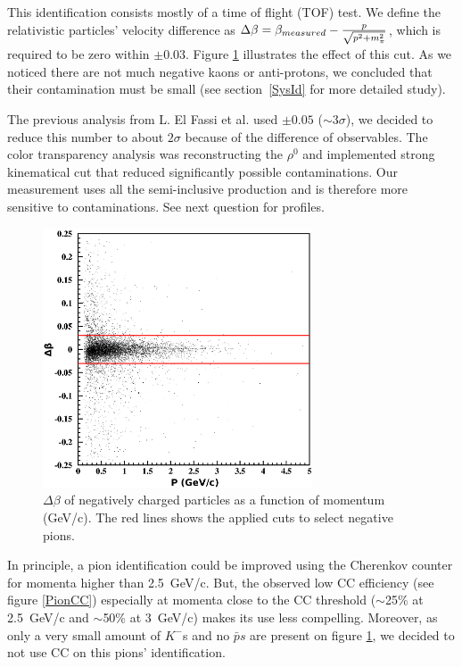 This identification consists mostly of a time of flight (TOF) test. We define 
the relativistic particles' velocity difference as
$\Delta \beta = \beta_{measured} - {p \over \sqrt{p^2 + m_\pi^2}}$, which is required to be zero within $\pm 0.03$. Figure \ref{PionTOF} illustrates the effect of this cut. As we noticed there are not much negative kaons or anti-protons, we concluded that their contamination must be small (see section~\ref{SysId} for more detailed study).

The previous analysis from L. El Fassi et al. used $\pm 0.05$ ($\sim 3\sigma$), we decided
to reduce this number to about $2\sigma$ because of the difference of observables. The 
color transparency analysis was reconstructing the $\rho^0$ and implemented strong kinematical
cut that reduced significantly possible contaminations. Our measurement uses all the 
semi-inclusive production and is therefore more sensitive to contaminations. See next 
question for profiles.

\begin{figure}[tbp]
\centering
\includegraphics[width=8cm] {chap5-fig/fig05.png} 
\caption {$\Delta \beta$ of negatively charged particles as a function of momentum (GeV/c). The red lines shows the applied cuts to select negative pions.}
\label{PionTOF}
\end{figure}

In principle, a pion identification could be improved using the Cherenkov counter 
for momenta higher than 2.5~GeV/c. But, the observed low CC efficiency (see figure 
\ref{PionCC}) especially at momenta close to the CC threshold ($\sim$25\% at 
2.5~GeV/c and $\sim$50\% at 3~GeV/c) makes its use less compelling. 
Moreover, as only a very small amount of $K^-$s and no ${\bar p}s$ are present on figure \ref{PionTOF}, we decided to not use CC on this pions' identification.


